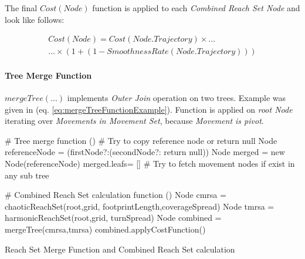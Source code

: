 \noindent The final $Cost(Node)$ function is applied to each \emph{Combined Reach Set Node} and look like follows:

\begin{multline}
    Cost(Node) = Cost(Node.Trajectory) \times\dots\\\dots\times \left(1+ \left(1-SmoothnessRate(N ode.T rajectory)\right)\right)
\end{multline}

\paragraph{Tree Merge Function} $mergeTree(\dots)$ implements \emph{Outer Join} operation on two trees. Example was given in (eq. \ref{eq:mergeTreeFunctionExample}).
Function is applied on \emph{root Node} iterating over \emph{Movements in Movement Set}, because \emph{Movement is pivot}.

\begin{algorithm}[H]
    
    \BlankLine
    \# Tree merge function\;
    \Fn(){}{
        \BlankLine
        \# Try to copy reference node or return null\;
        Node referenceNode = (firstNode?:(secondNode?: return null))\;
        Node merged =  new Node(referenceNode)\;
        merged.leafs= []\;
        \BlankLine
        \# Try to fetch movement nodes if exist in any sub tree\;
    }{}
    
    \BlankLine
    \# Combined Reach Set calculation function\;
    \Fn(){}{
        Node cmrsa = chaoticReachSet(root,grid, footprintLength,coverageSpread)\;
        Node tmrsa = harmonicReachSet(root,grid, turnSpread)\;
        Node combined = mergeTree(cmrsa,tmrsa)\;
        combined.applyCostFunction()\;
    }

    
    \caption{Reach Set Merge Function and Combined Reach Set calculation}
    \label{alg:ReachSetMerge}
\end{algorithm}

